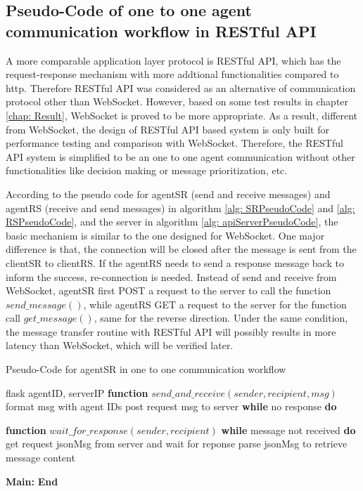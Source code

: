 \subsection{Pseudo-Code of one to one agent communication workflow in RESTful API}
A more comparable application layer protocol is RESTful API, which has the request-response mechanism with more addtional functionalities compared to \gls{http}. 
Therefore RESTful API was considered as an alternative of communication protocol other than WebSocket. 
However, based on some test results in chapter \ref{chap: Result}, WebSocket is 
proved to be more appropriate.
As a result, different from WebSocket, the design of RESTful API based system is only built for performance testing and comparison with WebSocket.
Therefore, the RESTful API system is simplified to be an one to one agent communication without other functionalities like decision making or message prioritization, etc.

According to the pseudo code for agentSR (send and receive messages) and 
agentRS (receive and send messages) in 
algorithm \ref{alg: SRPseudoCode} and \ref{alg: RSPseudoCode}, and the server 
in algorithm \ref{alg: apiServerPseudoCode}, 
the basic mechanism is similar to the one designed for WebSocket. One major 
difference is that, the connection will be closed after the message is sent 
from the clientSR to clientRS.
If the agentRS needs to send a response message back to inform the success, 
re-connection is needed. 
Instead of send and receive from WebSocket, agentSR first POST a request to the server to call the function $send\_message()$, 
while agentRS GET a request to the server for the function call $get\_message()$, same for the reverse direction. 
Under the same condition, the message transfer routine with RESTful API will possibly results in more latency than WebSocket, which will be verified later.
  
\begin{algorithm}
    \caption{Pseudo-Code for agentSR in one to one communication workflow}
    \label{alg: SRPseudoCode}
    \begin{algorithmic}[1]
     flask
     agentID, serverIP
        \State \textbf{function} {$send\_and\_receive(sender, recipient, msg)$}
        \State \qquad format msg with agent IDs 
        \State \qquad post request msg to server
        \State \textbf{\qquad while} no response \textbf{do}    
        \State \qquad {}

        \State \textbf{function} {$wait\_for\_response(sender, recipient)$}
        \State \textbf{\qquad while} message not received \textbf{do}    
        \State \qquad \qquad get request jsonMsg from server and wait for reponse
        \State \qquad \qquad parse jsonMsg to retrieve message content
    

    \State \textbf{Main:}
    \State {}
    \State \textbf{End} 
    \end{algorithmic}
    \end{algorithm}


